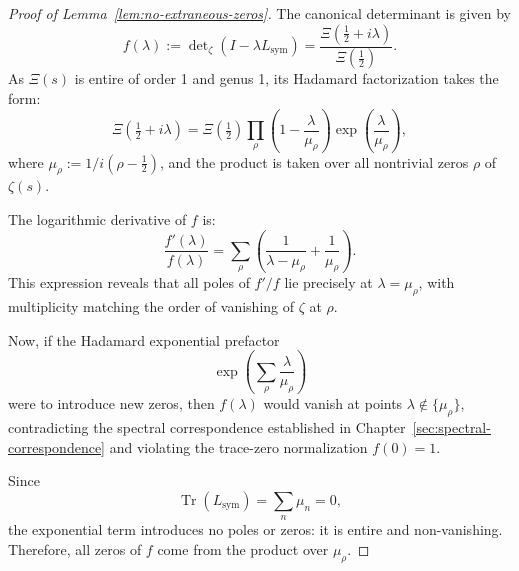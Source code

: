 \begin{proof}[Proof of Lemma~\ref{lem:no-extraneous-zeros}]
The canonical determinant is given by
\[
f(\lambda) := \det\nolimits_\zeta(I - \lambda L_{\mathrm{sym}})
= \frac{\Xi\left(\tfrac{1}{2} + i\lambda\right)}{\Xi\left(\tfrac{1}{2}\right)}.
\]
As \( \Xi(s) \) is entire of order 1 and genus 1, its Hadamard factorization takes the form:
\[
\Xi\left(\tfrac{1}{2} + i\lambda\right)
= \Xi\left(\tfrac{1}{2}\right)
\prod_{\rho} \left(1 - \frac{\lambda}{\mu_\rho} \right)
\exp\left( \frac{\lambda}{\mu_\rho} \right),
\]
where \( \mu_\rho := 1/i(\rho - \tfrac{1}{2}) \), and the product is taken over all nontrivial zeros \( \rho \) of \( \zeta(s) \).

The logarithmic derivative of \( f \) is:
\[
\frac{f'(\lambda)}{f(\lambda)}
= \sum_\rho \left( \frac{1}{\lambda - \mu_\rho} + \frac{1}{\mu_\rho} \right).
\]
This expression reveals that all poles of \( f'/f \) lie precisely at \( \lambda = \mu_\rho \), with multiplicity matching the order of vanishing of \( \zeta \) at \( \rho \).

Now, if the Hadamard exponential prefactor
\[
\exp\left( \sum_\rho \frac{\lambda}{\mu_\rho} \right)
\]
were to introduce new zeros, then \( f(\lambda) \) would vanish at points \( \lambda \notin \{ \mu_\rho \} \), contradicting the spectral correspondence established in Chapter~\ref{sec:spectral-correspondence} and violating the trace-zero normalization \( f(0) = 1 \).

Since
\[
\operatorname{Tr}(L_{\mathrm{sym}}) = \sum_n \mu_n = 0,
\]
the exponential term introduces no poles or zeros: it is entire and non-vanishing. Therefore, all zeros of \( f \) come from the product over \( \mu_\rho \).

\end{proof}
% 